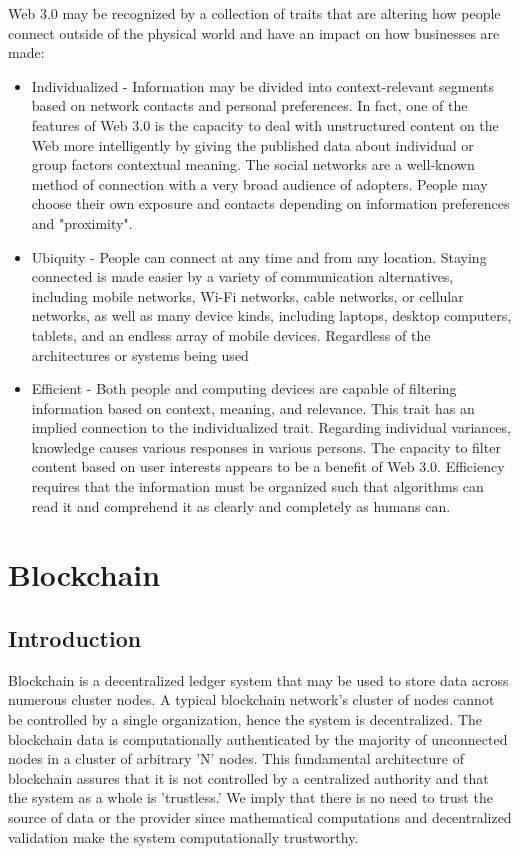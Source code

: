 Web 3.0 may be recognized by a collection of traits that are altering how people connect outside of the physical world and have an impact on how businesses are made: 
\begin{itemize}

    \item  Individualized - Information may be divided into context-relevant segments based on network contacts and personal preferences. In fact, one of the features of Web 3.0 is the capacity to deal with unstructured content on the Web more intelligently by giving the published data about individual or group factors contextual meaning. The social networks are a well-known method of connection with a very broad audience of adopters. People may choose their own exposure and contacts depending on information preferences and "proximity".

    \item 
  Ubiquity - People can connect at any time and from any location. Staying connected is made easier by a variety of communication alternatives, including mobile networks, Wi-Fi networks, cable networks, or cellular networks, as well as many device kinds, including laptops, desktop computers, tablets, and an endless array of mobile devices. Regardless of the architectures or systems being used


    \item  Efficient - Both people and computing devices are capable of filtering information based on context, meaning, and relevance. This trait has an implied connection to the individualized trait. Regarding individual variances, knowledge causes various responses in various persons. The capacity to filter content based on user interests appears to be a benefit of Web 3.0. Efficiency requires that the information must be organized such that algorithms can read it and comprehend it as clearly and completely as humans can.

\end{itemize}
\section{Blockchain}

\subsection{Introduction}
Blockchain is a decentralized ledger system that may be used to store data across numerous cluster nodes. A typical blockchain network's cluster of nodes cannot be controlled by a single organization, hence the system is decentralized. The blockchain data is computationally authenticated by the majority of unconnected nodes in a cluster of arbitrary 'N' nodes. This fundamental architecture of blockchain assures that it is not controlled by a centralized authority and that the system as a whole is 'trustless.' We imply that there is no need to trust the source of data or the provider since mathematical computations and decentralized validation make the system computationally trustworthy.

